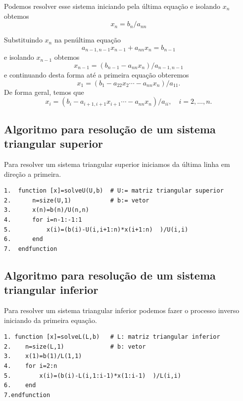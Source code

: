 Podemos resolver esse sistema iniciando pela última equação e isolando $x_n$ obtemos
\begin{equation}
 x_n = b_n/a_{nn}
\end{equation}

Substituindo $x_n$ na penúltima equação
\begin{equation}
 a_{n-1,n-1}x_{n-1}+a_{nn}x_n = b_{n-1}
\end{equation}
e isolando $x_{n-1}$ obtemos
\begin{equation}
 x_{n-1} = (b_{n-1}-a_{nn}x_n)/a_{n-1,n-1}
\end{equation}
e continuando desta forma até a primeira equação obteremos
\begin{equation}
 x_{1} = (b_{1}-a_{22}x_2 \cdots -a_{nn}x_n)/a_{11}.
\end{equation}
De forma geral, temos que
\begin{equation}
 x_{i} = (b_{i}-a_{i+1,i+1}x_{i+1} \cdots -a_{nn}x_n)/a_{ii}, \quad i=2,\dots,n.
\end{equation}



\subsection{Algoritmo para resolução de um sistema triangular superior}

Para resolver um sistema triangular superior iniciamos da última linha em direção a primeira.

\begin{verbatim}
1.  function [x]=solveU(U,b)  # U:= matriz triangular superior
2.      n=size(U,1)           # b:= vetor
3.      x(n)=b(n)/U(n,n)
4.      for i=n-1:-1:1
5.          x(i)=(b(i)-U(i,i+1:n)*x(i+1:n)  )/U(i,i)
6.      end
7.  endfunction

\end{verbatim}

\subsection{Algoritmo para resolução de um sistema triangular inferior}
Para resolver um sistema triangular inferior podemos fazer o processo inverso iniciando da primeira equação.

\begin{verbatim}
1. function [x]=solveL(L,b)   # L: matriz triangular inferior
2.    n=size(L,1)             # b: vetor
3.    x(1)=b(1)/L(1,1)
4.    for i=2:n
5.        x(i)=(b(i)-L(i,1:i-1)*x(1:i-1)  )/L(i,i)
6.    end
7.endfunction
\end{verbatim}


